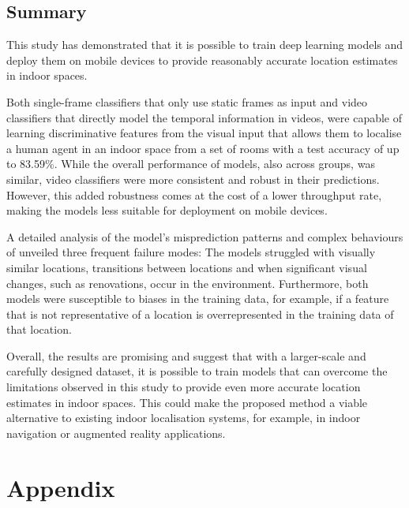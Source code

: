 \documentclass[a4paper]{article}
\begin{document}
\subsection{Summary} %
\label{sub:summary}

This study has demonstrated that it is possible to train deep learning models
and deploy them on mobile devices to provide reasonably accurate location
estimates in indoor spaces.

Both single-frame classifiers that only use static frames as input and video
classifiers that directly model the temporal information in videos, were capable
of learning discriminative features from the visual input that allows them to
localise a human agent in an indoor space from a set of rooms with a test
accuracy of up to 83.59\%. While the overall performance of models, also across
groups, was similar, video classifiers were more consistent and robust in their
predictions. However, this added robustness comes at the cost of a lower
throughput rate, making the models less suitable for deployment on mobile
devices.

A detailed analysis of the model's misprediction patterns and complex behaviours
of unveiled three frequent failure modes: The models struggled with visually
similar locations, transitions between locations and when significant visual
changes, such as renovations, occur in the environment. Furthermore, both models
were susceptible to biases in the training data, for example, if a feature that
is not representative of a location is overrepresented in the training data of
that location.

Overall, the results are promising and suggest that with a larger-scale and
carefully designed dataset, it is possible to train models that can overcome the
limitations observed in this study to provide even more accurate location
estimates in indoor spaces. This could make the proposed method a viable
alternative to existing indoor localisation systems, for example, in indoor
navigation or augmented reality applications.

\newpage



\newpage
\section{Appendix} %
\label{sec:appendix}
\end{document}

